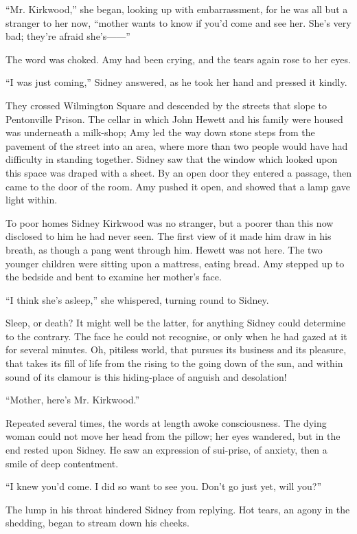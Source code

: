 ``Mr. Kirkwood,'' she began, looking up with embarrassment, for he was
all but a stranger to her now, ``mother wants to know if you'd come and
see her. She's very bad; they're afraid {she's{{------}}''}

The word was choked. Amy had been crying, and the tears again rose to
her eyes.

``I was just coming,'' Sidney answered, as he took her hand and pressed
it kindly.

They crossed Wilmington Square and descended by the streets that slope
to Pentonville Prison. The cellar in which John Hewett and his family
were housed was underneath a milk-shop; Amy led the way down stone steps
from the pavement of the street into an area, where more than two people
would have had difficulty in standing together. Sidney saw that the
window which looked upon this space was draped with a
{\protect\hypertarget{167}{}{}}sheet. By an open door they entered a
passage, then came to the door of the room. Amy pushed it open, and
showed that a lamp gave light within.

To poor homes Sidney Kirkwood was no stranger, but a poorer than this
now disclosed to him he had never seen. The first view of it made him
draw in his breath, as though a pang went through him. Hewett was not
here. The two younger children were sitting upon a mattress, eating
bread. Amy stepped up to the bedside and bent to examine her mother's
face.

``I think she's asleep,'' she whispered, turning round to Sidney.

Sleep, or death? It might well be the latter, for anything Sidney could
determine to the contrary. The face he could not recognise, or only when
he had gazed at it for several minutes. Oh, pitiless world, that pursues
its business and its pleasure, that takes its fill of life from the
rising to the going down of the sun, and within sound of its clamour is
this hiding-place of anguish and desolation!

{\protect\hypertarget{168}{}{}}``Mother, here's Mr. Kirkwood.''

Repeated several times, the words at length awoke consciousness. The
dying woman could not move her head from the pillow; her eyes wandered,
but in the end rested upon Sidney. He saw an expression of sui-prise, of
anxiety, then a smile of deep contentment.

``I knew you'd come. I did so want to see you. Don't go just yet, will
you?''

The lump in his throat hindered Sidney from replying. Hot tears, an
agony in the shedding, began to stream down his cheeks.


